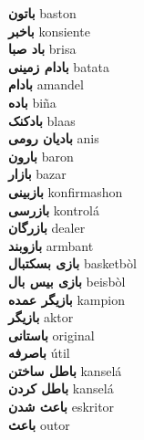 \textbf{ باتون  } baston \\
\textbf{ باخبر  } konsiente \\
\textbf{ باد صبا  } brisa \\
\textbf{ بادام زمینی  } batata \\
\textbf{ بادام  } amandel \\
\textbf{ باده  } biña \\
\textbf{ بادکنک  } blaas \\
\textbf{ بادیان رومی  } anis \\
\textbf{ بارون  } baron \\
\textbf{ بازار  } bazar \\
\textbf{ بازبینی  } konfirmashon \\
\textbf{ بازرسی  } kontrolá \\
\textbf{ بازرگان  } dealer \\
\textbf{ بازوبند  } armbant \\
\textbf{ بازی بسکتبال  } basketbòl \\
\textbf{ بازی بیس بال  } beisbòl \\
\textbf{ بازیگر عمده  } kampion \\
\textbf{ بازیگر  } aktor \\
\textbf{ باستانی  } original \\
\textbf{ باصرفه  } útil \\
\textbf{ باطل ساختن  } kanselá \\
\textbf{ باطل کردن  } kanselá \\
\textbf{ باعث شدن  } eskritor \\
\textbf{ باعث  } outor \\
